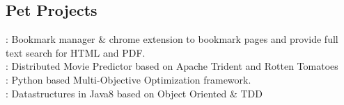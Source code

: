 \documentclass[]{bigfatnoob-resume}
\begin{document}
\begin{minipage}[t]{0.33\textwidth}
\subsection{Pet Projects}
\href{http://Region.io}{}: Bookmark manager \& chrome extension to bookmark pages and provide full text search for HTML and PDF.\\
\href{https://github.com/NCSU-Advanced-Algos/octorater}{}: Distributed Movie Predictor based on Apache Trident and Rotten Tomatoes\\
\href{https://github.com/bigfatnoob/optima}{}: Python based Multi-Objective Optimization framework.\\
\href{https://github.com/dr-bigfatnoob/collections}{}: Datastructures in Java8 based on Object Oriented \& TDD


%
%

\end{minipage} 
\hfill
\end{document}
